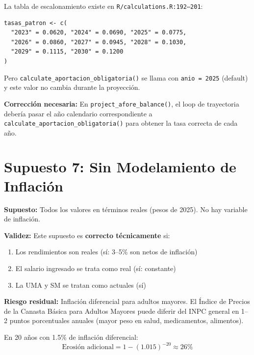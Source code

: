 \documentclass[11pt,a4paper]{report}
\begin{document}
\begin{tcolorbox}[colback=orange!5!white, colframe=orange!75!black, title=\textbf{Aplicaci\'on en C\'odigo}]
La tabla de escalonamiento existe en \texttt{R/calculations.R:192--201}:
\begin{lstlisting}
tasas_patron <- c(
  "2023" = 0.0620, "2024" = 0.0690, "2025" = 0.0775,
  "2026" = 0.0860, "2027" = 0.0945, "2028" = 0.1030,
  "2029" = 0.1115, "2030" = 0.1200
)
\end{lstlisting}

Pero \texttt{calculate\_aportacion\_obligatoria()} se llama con \texttt{anio = 2025} (default) y este valor no cambia durante la proyecci\'on.

\textbf{Correcci\'on necesaria:} En \texttt{project\_afore\_balance()}, el loop de trayectoria deber\'ia pasar el a\~no calendario correspondiente a \texttt{calculate\_aportacion\_obligatoria()} para obtener la tasa correcta de cada a\~no.
\end{tcolorbox}


\section{Supuesto 7: Sin Modelamiento de Inflaci\'on}

\begin{tcolorbox}[colback=blue!5!white, colframe=blue!75!black, title=\textbf{Definici\'on Formal}]
\textbf{Supuesto:} Todos los valores en t\'erminos reales (pesos de 2025). No hay variable de inflaci\'on.

\textbf{Validez:} Este supuesto es \textbf{correcto t\'ecnicamente} si:
\begin{enumerate}
  \item Los rendimientos son reales (s\'i: 3--5\% son netos de inflaci\'on)
  \item El salario ingresado se trata como real (s\'i: constante)
  \item La UMA y SM se tratan como actuales (s\'i)
\end{enumerate}

\textbf{Riesgo residual:} Inflaci\'on diferencial para adultos mayores. El \'Indice de Precios de la Canasta B\'asica para Adultos Mayores puede diferir del INPC general en 1--2 puntos porcentuales anuales (mayor peso en salud, medicamentos, alimentos).

En 20 a\~nos con 1.5\% de inflaci\'on diferencial:
\[
  \text{Erosi\'on adicional} = 1 - (1.015)^{-20} \approx 26\%
\]
\end{tcolorbox}
\end{document}
